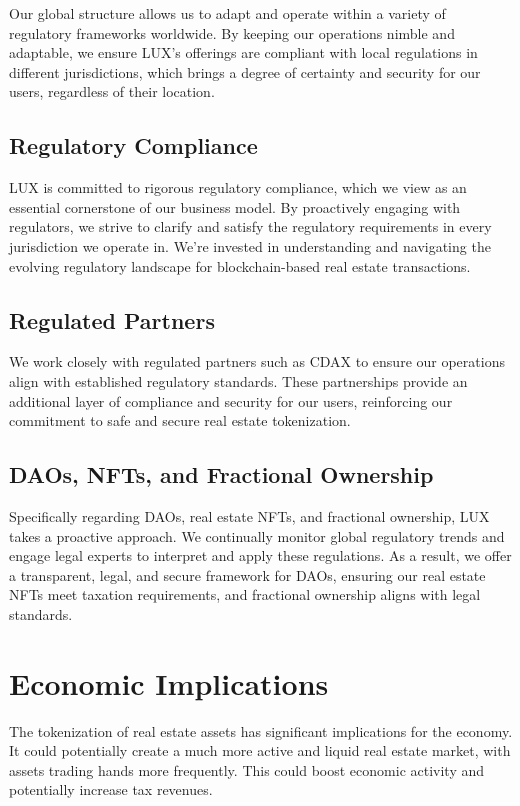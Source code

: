 \documentclass[11pt]{article}
\begin{document}
Our global structure allows us to adapt and operate within a variety of regulatory frameworks worldwide. By keeping our operations nimble and adaptable, we ensure LUX's offerings are compliant with local regulations in different jurisdictions, which brings a degree of certainty and security for our users, regardless of their location.


\subsection{Regulatory Compliance}

LUX is committed to rigorous regulatory compliance, which we view as an essential cornerstone of our business model. By proactively engaging with regulators, we strive to clarify and satisfy the regulatory requirements in every jurisdiction we operate in. We're invested in understanding and navigating the evolving regulatory landscape for blockchain-based real estate transactions.


\subsection{Regulated Partners}

We work closely with regulated partners such as CDAX to ensure our operations align with established regulatory standards. These partnerships provide an additional layer of compliance and security for our users, reinforcing our commitment to safe and secure real estate tokenization.


\subsection{DAOs, NFTs, and Fractional Ownership}

Specifically regarding DAOs, real estate NFTs, and fractional ownership, LUX takes a proactive approach. We continually monitor global regulatory trends and engage legal experts to interpret and apply these regulations. As a result, we offer a transparent, legal, and secure framework for DAOs, ensuring our real estate NFTs meet taxation requirements, and fractional ownership aligns with legal standards.


\section{Economic Implications}

The tokenization of real estate assets has significant implications for the economy. It could potentially create a much more active and liquid real estate market, with assets trading hands more frequently. This could boost economic activity and potentially increase tax revenues.
\end{document}
